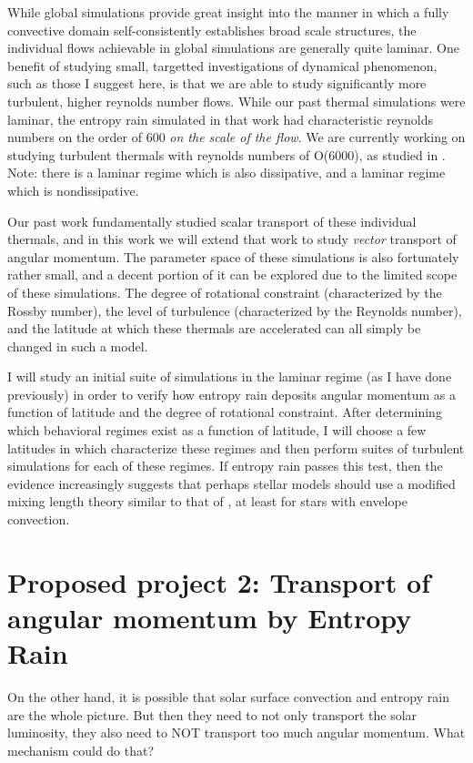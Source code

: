 \documentclass[aasms,12pt]{article}
\begin{document}
While global simulations provide great insight into the manner in which a fully convective domain self-consistently establishes broad scale structures, the individual flows achievable in global simulations are generally quite laminar.
One benefit of studying small, targetted investigations of dynamical phenomenon, such as those I suggest here, is that we are able to study significantly more turbulent, higher reynolds number flows.
While our past thermal simulations \citep{andersLB2019} were laminar, the entropy rain simulated in that work had characteristic reynolds numbers on the order of 600 \emph{on the scale of the flow}.
We are currently working on studying turbulent thermals with reynolds numbers of O(6000), as studied in \citet{lecoanet&jeevanjee2019}.
Note: there is a laminar regime which is also dissipative, and a laminar regime which is nondissipative.

Our past work fundamentally studied scalar transport of these individual thermals, and in this work we will extend that work to study \emph{vector} transport of angular momentum.
The parameter space of these simulations is also fortunately rather small, and a decent portion of it can be explored due to the limited scope of these simulations.
The degree of rotational constraint (characterized by the Rossby number), the level of turbulence (characterized by the Reynolds number), and the latitude at which these thermals are accelerated can all simply be changed in such a model.

I will study an initial suite of simulations in the laminar regime (as I have done previously) in order to verify how entropy rain deposits angular momentum as a function of latitude and the degree of rotational constraint.
After determining which behavioral regimes exist as a function of latitude, I will choose a few latitudes in which characterize these regimes and then perform suites of turbulent simulations for each of these regimes.
If entropy rain passes this test, then the evidence increasingly suggests that perhaps stellar models should use a modified mixing length theory similar to that of \citet{brandenburg2016}, at least for stars with envelope convection.

\section{Proposed project 2: Transport of angular momentum by Entropy Rain}
\label{sct:global_models}
On the other hand, it is possible that solar surface convection and entropy rain are the whole picture.
But then they need to not only transport the solar luminosity, they also need to NOT transport too much angular momentum.
What mechanism could do that?
\end{document}
